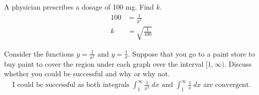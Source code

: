 \documentclass[12pt]{article}
\newenvironment{problem}[2][]{
    \begin{trivlist}
        \item[
            {\bfseries #1}
            {\bfseries #2.}
        ]
}{\end{trivlist}}
\begin{document}
\begin{problem}{50}
A physician prescribes a dosage of 100 mg. Find $k$.
\begin{align}
100 &= \frac{1}{k^2} \\
k &= \sqrt{\frac{1}{100}}
\end{align}
\end{problem}

\begin{problem}{51}
Consider the functions $y = \frac{1}{x^2}$ and $y = \frac{1}{x}$.
Suppose that you go to a paint store to buy paint to cover the region under each graph over the interval $[1, \infty)$. Discuss whether you could be successful and why or why not.
\begin{align}
\text{I could be successful as both integrals } \int_1^\infty \frac{1}{x^2} ~ dx \text{ and } \int_1^\infty \frac{1}{x} ~ dx \text{ are convergent.}
\end{align}
\end{problem}
\end{document}
